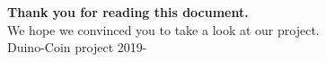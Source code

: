 \documentclass[14pt, a4paper, twoside, openany, dvipsnames]{extreport}
\begin{document}
\begin{justify}
\textbf{Thank you for reading this document.} \\
We hope we convinced you to take a look at our project.
\\[0.5cm]
\small
\textcolor{sun_yellow}{Duino-Coin project 2019-\the\year}
\end{justify}
\end{document}
